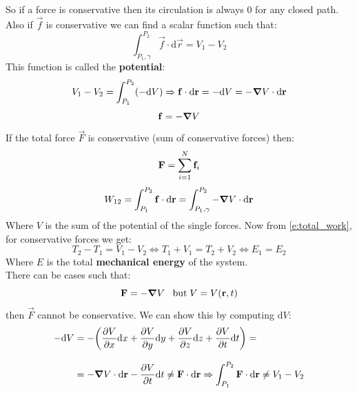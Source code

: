 So if a force is conservative then its circulation is always 0 for any closed path.\\
Also if $\vec{f}$ is conservative we can find a scalar function such that:
\begin{equation}
    \int_{P_1,\gamma}^{P_2}\vec{f}\cdot\mathrm{d}\vec{r} = V_1-V_2
\end{equation}
This function is called the \textbf{potential}:
\begin{equation}
    V_1-V_2 = \int_{P_1}^{P_2}(-\mathrm{d}V) \Rightarrow \vb{f}\cdot\mathrm{d}\vb{r} = -\mathrm{d}V = -\grad V \cdot \mathrm{d}\vb{r}
\end{equation}
\begin{equation}
    \vb{f} = -\grad V
\end{equation}
If the total force $\vec{F}$ is conservative (sum of conservative forces) then:
\begin{equation}
    \vb{F} = \displaystyle\sum_{i=1}^{N} \vb{f}_i
\end{equation}
\begin{equation}
    W_{12}=\int_{P_1}^{P_2}\vb{f}\cdot\mathrm{d}\vb{r} = \int_{P_1,\gamma}^{P_2}-\grad V\cdot\mathrm{d}\vb{r}
\end{equation}
Where $V$ is the sum of the potential of the single forces. Now from \eqref{e:total_work}, for conservative forces we get:
\begin{equation} \label{e:mech_energy}
    T_2 - T_1 = V_1 - V_2 \iff T_1 + V_1 = T_2 + V_2\iff E_1 = E_2
\end{equation}
Where $E$ is the total \textbf{mechanical energy} of the system.\\
There can be cases such that:
\begin{equation}
    \vb{F} = -\grad V \;\;\;\mathrm{but}\;V=V(\vb{r},t)
\end{equation}
then $\vec{F}$ cannot be conservative. We can show this by computing $\mathrm{d}V$:
\begin{equation}
    \begin{split}
      -\mathrm{d}V &= -\bigg(\dfrac{\partial V}{\partial x}\mathrm{d}x + \dfrac{\partial V}{\partial y}\mathrm{d}y + \dfrac{\partial V}{\partial z}\mathrm{d}z + \dfrac{\partial V}{\partial t}\mathrm{d}t\bigg) = \\[8pt]
    &= -\grad V \cdot\mathrm{d}\vb{r} - \dfrac{\partial V}{\partial t}\mathrm{d}t \neq \vb{F}\cdot\mathrm{d}\vb{r} \Rightarrow \int_{P_1}^{P_2}\vb{F}\cdot\mathrm{d}\vb{r} \neq V_1-V_2
    \end{split}
\end{equation}
